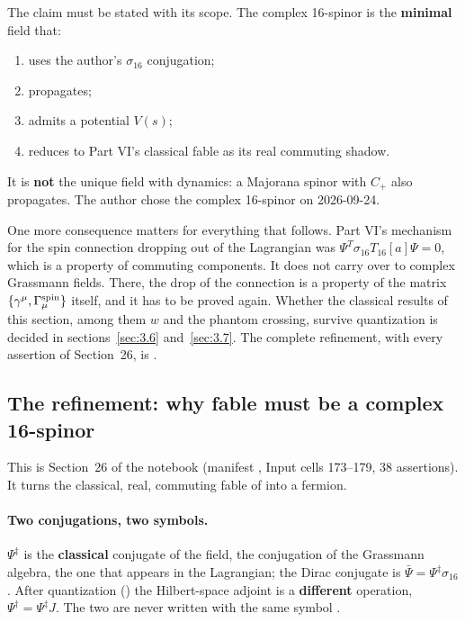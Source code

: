 The claim must be stated with its scope. The complex 16-spinor is the \textbf{minimal} field
that:
\begin{enumerate}
  \item uses the author's $\sigma_{16}$ conjugation;
  \item propagates;
  \item admits a potential $V(s)$;
  \item reduces to Part VI's classical fable as its real commuting shadow.
\end{enumerate}
It is \textbf{not} the unique field with dynamics: a Majorana spinor with $C_+$ also propagates.
The author chose the complex 16-spinor on 2026-09-24.

One more consequence matters for everything that follows. Part VI's mechanism for the spin
connection dropping out of the Lagrangian was $\Psi^{T}\sigma_{16}T_{16}[a]\Psi=0$, which is a
property of commuting components. It does not carry over to complex Grassmann fields. There, the
drop of the connection is a property of the matrix $\{\gamma^\mu,\Gamma^{\rm spin}_\mu\}$ itself,
and it has to be proved again. Whether the classical results of this section, among them $w$ and
the phantom crossing, survive quantization is decided in sections~\ref{sec:3.6} and~\ref{sec:3.7}. The
complete refinement, with every assertion of Section~26, is .

\endgroup

\subsection{The refinement: why fable must be a complex 16-spinor}
\label{sec:3.2}

This is Section~26 of the notebook (manifest , Input cells
173--179, 38 assertions). It turns the classical, real, commuting fable of  into a
fermion.

\paragraph{Two conjugations, two symbols.} $\Psi^{\ddagger}$ is the \textbf{classical} conjugate of
the field, the conjugation of the Grassmann algebra, the one that appears in the Lagrangian; the
Dirac conjugate is $\bar\Psi=\Psi^{\ddagger}\sigma_{16}$. After quantization () the
Hilbert-space adjoint is a \textbf{different} operation, $\Psi^{\dagger}=\Psi^{\ddagger}J$. The two
are never written with the same symbol .


